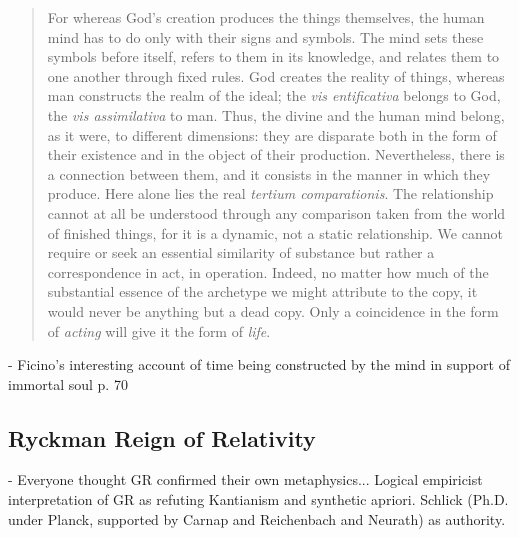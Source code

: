 \begin{quote}
    For whereas God's creation produces the things themselves, the human mind has to do only with their signs and symbols.  The mind sets these symbols before itself, refers to them in its knowledge, and relates them to one another through fixed rules.  God creates the reality of things, whereas man constructs the realm of the ideal; the \emph{vis entificativa} belongs to God, the \emph{vis assimilativa} to man.  Thus, the divine and the human mind belong, as it were, to different dimensions: they are disparate both in the form of their existence and in the object of their production.  Nevertheless, there is a connection between them, and it consists in the manner in which they produce.  Here alone lies the real \emph{tertium comparationis}.  The relationship cannot at all be understood through any comparison taken from the world of finished things, for it is a dynamic, not a static relationship.  We cannot require or seek an essential similarity of substance but rather a correspondence in act, in operation.  Indeed, no matter how much of the substantial essence of the archetype we might attribute to the copy, it would never be anything but a dead copy.  Only a coincidence in the form of \emph{acting} will give it the form of \emph{life}.

    \citep[p. 68]{Cassirer1927}
\end{quote}

- Ficino's interesting account of time being constructed by the mind in support of immortal soul p. 70




\subsection{Ryckman Reign of Relativity}

- Everyone thought GR confirmed their own metaphysics... Logical empiricist interpretation of GR as refuting Kantianism and synthetic apriori.  Schlick (Ph.D. under Planck, supported by Carnap and Reichenbach and Neurath) as authority.  

